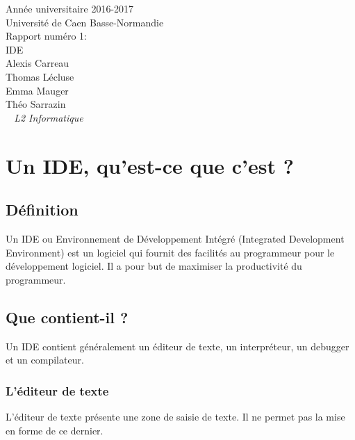 \documentclass[a4paper,12pt]{article}
\begin{document}
\begin{titlepage}
	\begin{center}
		\Large{Année universitaire 2016-2017}\\
		\Large{Université de Caen Basse-Normandie}\\[1cm]
		
		\huge{Rapport numéro 1:}\\
		IDE\\
		\vspace{3cm}
		Alexis Carreau\\
		Thomas Lécluse\\
		Emma Mauger\\
		Théo Sarrazin\\
	\normalsize{\textit{ ~ L2 Informatique}}\\
		\medskip
		\vspace{2cm}
		
	\end{center}
\end{titlepage}

\tableofcontents
\newpage

\section{Un IDE, qu'est-ce que c'est ?}

\subsection{Définition}

Un  IDE   ou  Environnement   de  Développement   Intégré  (Integrated
Development Environment) est un logiciel  qui fournit des facilités au
programmeur pour le développement logiciel. Il a pour but de maximiser
la productivité du programmeur.

\subsection{Que contient-il ?}

Un IDE contient généralement un  éditeur de texte, un interpréteur, un
debugger et un compilateur.

\subsubsection{L'éditeur de texte}

L'éditeur de texte présente une zone  de saisie de texte. Il ne permet
pas la mise en forme de ce dernier.
\end{document}
